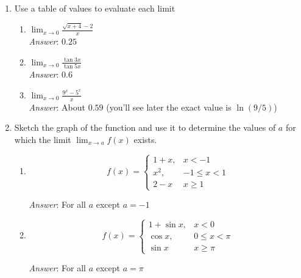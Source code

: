 \documentclass[11pt]{article}
\begin{document}
\begin{enumerate}
\item Use a table of values to evaluate each limit

\begin{enumerate}

\item $\lim_{x\rightarrow 0}\frac{\sqrt{x+4}-2}{x}$\\

{\em Answer}:  $0.25$\\

\item $\lim_{x\rightarrow 0}\frac{\tan 3x}{\tan 5x}$\\



{\em Answer}:  $0.6$\\

\item $\lim_{x\rightarrow 0}\frac{9^x-5^x}{x}$\\


{\em Answer}:  About $0.59$ (you'll see later the exact value is $\ln(9/5)$)\\



\end{enumerate}

\newpage

\item Sketch the graph of the function and use it to determine the values of $a$ for which the limit $\lim_{x\rightarrow a}f(x)$ exists.\\

\begin{enumerate}

\item \[f(x)=\begin{cases} 1+x, & x<-1 \\ x^2, & -1\leq x<1 \\ 2-x & x\geq 1 \end{cases} \]

{\em Answer}: For all $a$ except $a=-1$\\

\item \[f(x)=\begin{cases} 1+\sin x, & x<0 \\ \cos x, & 0\leq x<\pi \\ \sin x & x\geq \pi \end{cases} \]

{\em Answer}: For all $a$ except $a=\pi$\\


\end{enumerate}
\end{enumerate}
\end{document}
